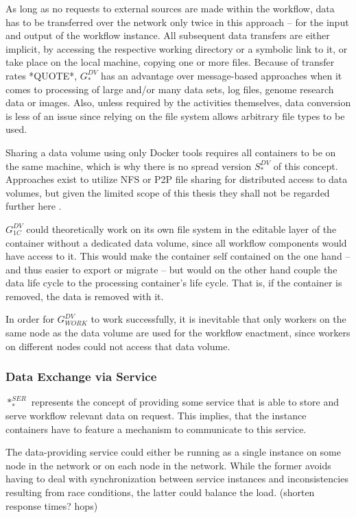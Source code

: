     As long as no requests to external sources are made within the workflow, data has to be transferred over the network only twice in this approach -- for the input and output of the workflow instance. All subsequent data transfers are either implicit, \eg by accessing the respective working directory or a symbolic link to it, or take place on the local machine, \eg copying one or more files. Because of transfer rates *QUOTE*, $G_{*}^{DV}$ has an advantage over message-based approaches when it comes to processing of large and/or many data sets, \ie log files, genome research data or images. Also, unless required by the activities themselves, data conversion is less of an issue since relying on the file system allows arbitrary file types to be used.

    Sharing a data volume using only Docker tools requires all containers to be on the same machine, which is why there is no spread version $S_{*}^{DV}$ of this concept. Approaches exist to utilize \ac{NFS} or \ac{P2P} file sharing for distributed access to data volumes, but given the limited scope of this thesis they shall not be regarded further here \cite{Miell2015How}.

    $G_{1C}^{DV}$ could theoretically work on its own file system in the editable layer of the container without a dedicated data volume, since all workflow components would have access to it. This would make the container self contained on the one hand -- and thus easier to export or migrate -- but would on the other hand couple the data life cycle to the processing container's life cycle. That is, if the container is removed, the data is removed with it.

    In order for $G_{WORK}^{DV}$ to work successfully, it is inevitable that only workers on the same node as the data volume are used for the workflow enactment, since workers on different nodes could not access that data volume.

  \subsubsection{Data Exchange via Service} %
  \label{ssub:data_exchange_via_service}
    $*_{*}^{SER}$ represents the concept of providing some service that is able to store and serve workflow relevant data on request. This implies, that the instance containers have to feature a mechanism to communicate to this service.

    The data-providing service could either be running as a single instance on some node in the network or on each node in the network. While the former avoids having to deal with synchronization between service instances and inconsistencies resulting from race conditions, the latter could balance the load. (shorten response times? hops)

